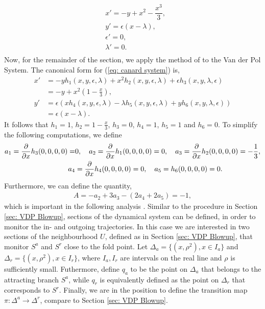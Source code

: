 \begin{equation}
\begin{aligned}
&x'=-y+x^2-\dfrac{x^3}{3},\\
&y'=\epsilon(x-\lambda),\\
&\epsilon'=0,\\
&\lambda'=0.\\
\end{aligned}
\label{eq: extended canard system}
\end{equation}
Now, for the remainder of the section, we apply the method of \citet{krupa2001} to the Van der Pol System. The canonical form for (\ref{eq: canard system}) is,
\begin{equation} \label{canardysy2var}
	\begin{aligned}
		x'&=-yh_1(x,y,\epsilon,\lambda)+x^2h_2(x,y,\epsilon,\lambda) + \epsilon h_3(x,y,\lambda,\epsilon)\\
                        &= -y + x^2 \left( 1- \frac{x}{3} \right),\\
		y'&=\epsilon(xh_4(x,y,\epsilon,\lambda)-\lambda h_5(x,y,\epsilon,\lambda) + y h_6(x,y,\lambda,\epsilon)) \\
                        &= \epsilon( x- \lambda).
	\end{aligned}
\end{equation}
It follows that $h_1 = 1$, $h_2 = 1-\frac{x}{3}$, $h_3=0$, $h_4 =1$, $h_5=1$ and $h_6=0$.
To simplify the following computations, we define
\begin{align*}
a_1=\pd{}{x}h_3(0,0,0,0)=& 0, \ \ \
a_2=\pd{}{x}h_1(0,0,0,0)= 0,\ \ \ 
a_3=\pd{}{x}h_2(0,0,0,0)=-\frac{1}{3},\\
a_4&=\pd{}{x}h_4(0,0,0,0)=0,\ \ \
a_5=h_6(0,0,0,0)=0.
\end{align*}
Furthermore, we can define the quantity,
\begin{align*}
A=-a_2+3a_3-(2a_4+2a_5)=-1,
\end{align*}
which is important in the following analysis \citep{krupa2001}. 
Similar to the procedure in Section \ref{sec: VDP Blowup}, sections of the dynamical system can be defined, in order to monitor the in- and outgoing trajectories. In this case we are interested in two sections of the neighbourhood $U$, defined as in Section \ref{sec: VDP Blowup}, that monitor $S^a$ and $S^r$ close to the fold point.
Let $ \Delta_a = \{ (x,\rho^2), x \in  I_a \}$ and $\Delta_r= \{ (x,\rho^2), x \in  I_r \}$, where $I_a,I_r$ are intervals on the real line and $\rho$ is sufficiently small.
Futhermore, define $q_a$ to be the point on $\Delta_a$ that belongs to the attracting branch $S^a$, while $q_r$ is equivalently defined as the point on $\Delta_r$ that corresponds to $S^r$. Finally, we are in the position to define the transition map $\pi: \Delta^a \to \Delta^r$, compare to Section \ref{sec: VDP Blowup}.
